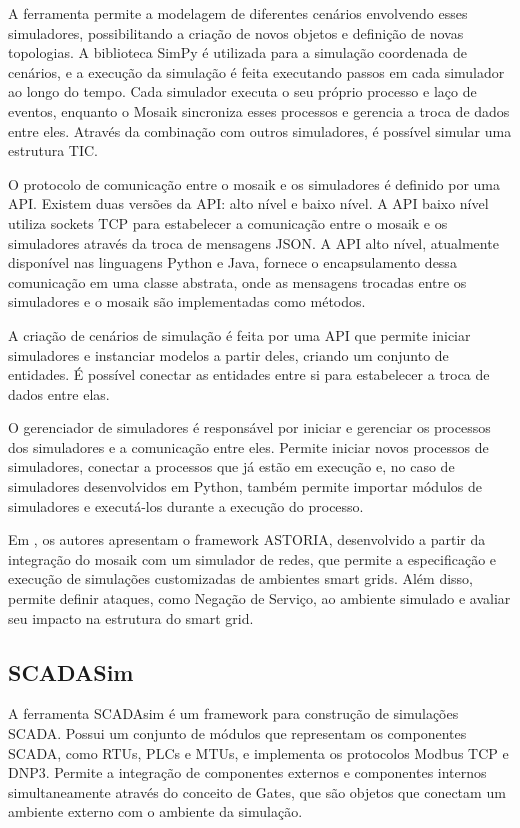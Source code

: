 \documentclass[cic,tc]{iiufrgs}
\begin{document}
A ferramenta permite a modelagem de diferentes cenários envolvendo esses simuladores, possibilitando a criação de novos objetos e definição de novas topologias. A biblioteca SimPy é utilizada para a simulação coordenada de cenários, e a execução da simulação é feita executando passos em cada simulador ao longo do tempo. Cada simulador executa o seu próprio processo e laço de eventos, enquanto o Mosaik sincroniza esses processos e gerencia a troca de dados entre eles. Através da combinação com outros simuladores, é possível simular uma estrutura TIC.

O protocolo de comunicação entre o mosaik e os simuladores é definido por uma API. Existem duas versões da API: alto nível e baixo nível. A API baixo nível utiliza sockets TCP para estabelecer a comunicação entre o mosaik e os simuladores através da troca de mensagens JSON. A API alto nível, atualmente disponível nas linguagens Python e Java, fornece o encapsulamento dessa comunicação em uma classe abstrata, onde as mensagens trocadas entre os simuladores e o mosaik são implementadas como métodos.

A criação de cenários de simulação é feita por uma API que permite iniciar simuladores e instanciar modelos a partir deles, criando um conjunto de entidades. É possível conectar as entidades entre si para estabelecer a troca de dados entre elas.

O gerenciador de simuladores é responsável por iniciar e gerenciar os processos dos simuladores e a comunicação entre eles. Permite iniciar novos processos de simuladores, conectar a processos que já estão em execução e, no caso de simuladores desenvolvidos em Python, também permite importar módulos de simuladores e executá-los durante a execução do processo.

Em \cite{wermann2015astoria}, os autores apresentam o framework ASTORIA, desenvolvido a partir da integração do mosaik com um simulador de redes, que permite a especificação e execução de simulações customizadas de ambientes smart grids. Além disso, permite definir ataques, como Negação de Serviço, ao ambiente simulado e avaliar seu impacto na estrutura do smart grid.

\subsection{SCADASim}
A ferramenta SCADAsim \cite{scadasimart} é um framework para construção de simulações SCADA. Possui um conjunto de módulos que representam os componentes SCADA, como RTUs, PLCs e MTUs, e implementa os protocolos Modbus TCP e DNP3. Permite a integração de componentes externos e componentes internos simultaneamente através do conceito de Gates, que são objetos que conectam um ambiente externo com o ambiente da simulação.
\end{document}
